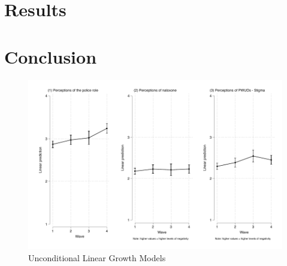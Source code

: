 \section{Results}
\section{Conclusion}







\begin{figure}
    \centering
    \caption{\centering Unconditional Linear Growth Models}
    \includegraphics{figures/growth_models.pdf}
\end{figure}





